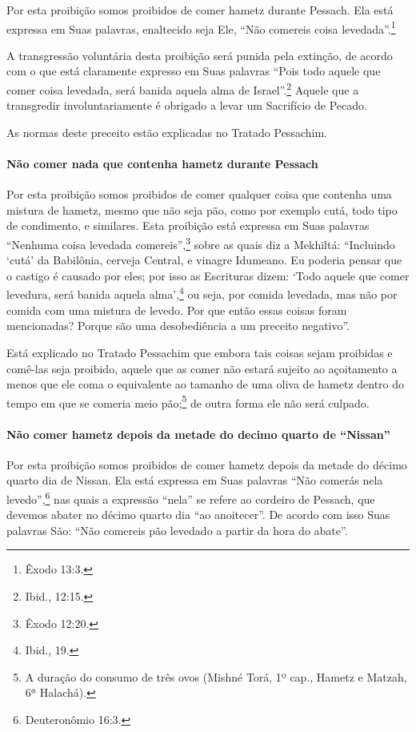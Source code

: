 Por esta proibição somos proibidos de comer hametz durante
Pessach. Ela está expressa em Suas palavras, enaltecido seja Ele,
``Não comereis coisa levedada''.\footnote{Êxodo 13:3.}

A transgressão voluntária desta proibição será punida pela extinção, de
acordo com o que está claramente expresso em Suas palavras ``Pois todo
aquele que comer coisa levedada, será banida aquela alma de Israel''.\footnote{Ibid., 12:15.} Aquele que a transgredir involuntariamente é obrigado a
levar um Sacrifício de Pecado.

As normas deste preceito estão explicadas no Tratado Pessachim.

\paragraph{Não comer nada que contenha hametz durante Pessach}

Por esta proibição somos proibidos de comer qualquer coisa que contenha
uma mistura de hametz, mesmo que não seja pão, como por exemplo
cutá,\starr{} todo tipo de condimento, e similares.
Esta proibição está expressa em Suas palavras ``Nenhuma coisa levedada
comereis'',\footnote{Êxodo 12:20.} sobre as quais diz a Mekhiltá: ``Incluindo
`cutá' da Babilônia, cerveja Central, e vinagre Idumeano. Eu poderia
pensar que o castigo é causado por eles; por isso as Escrituras dizem:
`Todo aquele que comer levedura, será banida aquela alma',\footnote{Ibid., 19.}
ou seja, por comida levedada, mas não por comida com uma mistura de
levedo. Por que então essas coisas foram mencionadas? Porque são uma
desobediência a um preceito negativo''.

Está explicado no Tratado Pessachim que embora tais coisas sejam
proibidas e comê-las seja proibido, aquele que as comer não estará
sujeito ao açoitamento a menos que ele coma o equivalente ao tamanho de
uma oliva de hametz dentro do tempo em que se comeria meio
pão;\footnote{A duração do consumo de três ovos (Mishné Torá, 1º cap., Hametz e
  Matzah, 6ª Halachá).} de outra forma ele não será culpado.

\paragraph{Não comer hametz depois da metade do decimo quarto de ``Nissan''}

Por esta proibição somos proibidos de comer hametz depois da metade
do décimo quarto dia de Nissan. Ela está expressa em Suas palavras ``Não
comerás nela levedo'',\footnote{Deuteronômio 16:3.} nas quais a expressão
``nela'' se refere ao cordeiro de Pessach, que devemos abater no
décimo quarto dia ``ao anoitecer''. De acordo com isso Suas palavras
São: ``Não comereis pão levedado a partir da hora do abate''.

